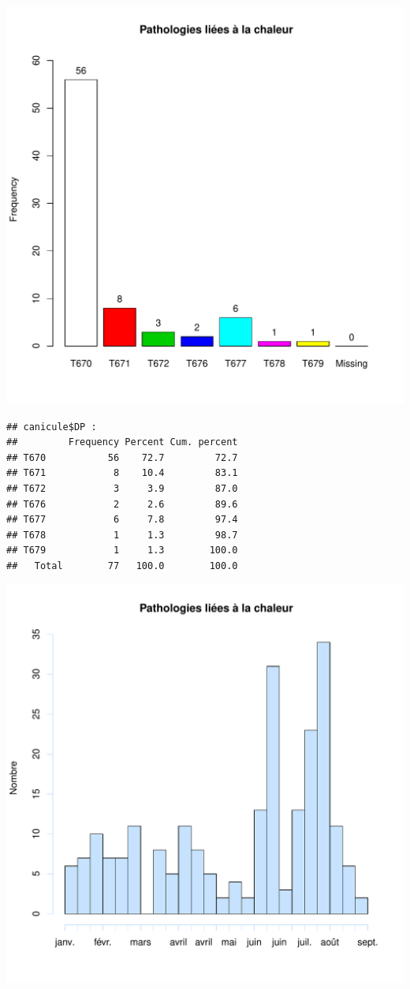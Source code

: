 \documentclass[12pt,english,french,twoside]{report}\usepackage[]{graphicx}\usepackage[]{color}
\makeatletter
\def\maxwidth{ %
  \ifdim\Gin@nat@width>\linewidth
    \linewidth
  \else
    \Gin@nat@width
  \fi
}
\newenvironment{kframe}{%
 \def\at@end@of@kframe{}%
 \ifinner\ifhmode%
  \def\at@end@of@kframe{\end{minipage}}%
  \begin{minipage}{\columnwidth}%
 \fi\fi%
 \def\FrameCommand##1{\hskip\@totalleftmargin \hskip-\fboxsep
 \colorbox{shadecolor}{##1}\hskip-\fboxsep
     \hskip-\linewidth \hskip-\@totalleftmargin \hskip\columnwidth}%
 \MakeFramed {\advance\hsize-\width
   \@totalleftmargin\z@ \linewidth\hsize
   \@setminipage}}%
 {\par\unskip\endMakeFramed%
 \at@end@of@kframe}
\newenvironment{knitrout}{}{} %
\makeatother
\begin{document}
\begin{knitrout}
\includegraphics[width=\maxwidth]{figure/canicule2} 
\begin{kframe}\begin{verbatim}
## canicule$DP : 
##         Frequency Percent Cum. percent
## T670           56    72.7         72.7
## T671            8    10.4         83.1
## T672            3     3.9         87.0
## T676            2     2.6         89.6
## T677            6     7.8         97.4
## T678            1     1.3         98.7
## T679            1     1.3        100.0
##   Total        77   100.0        100.0
\end{verbatim}
\end{kframe}
\includegraphics[width=\maxwidth]{figure/canicule3} 

\end{knitrout}
\end{document}
